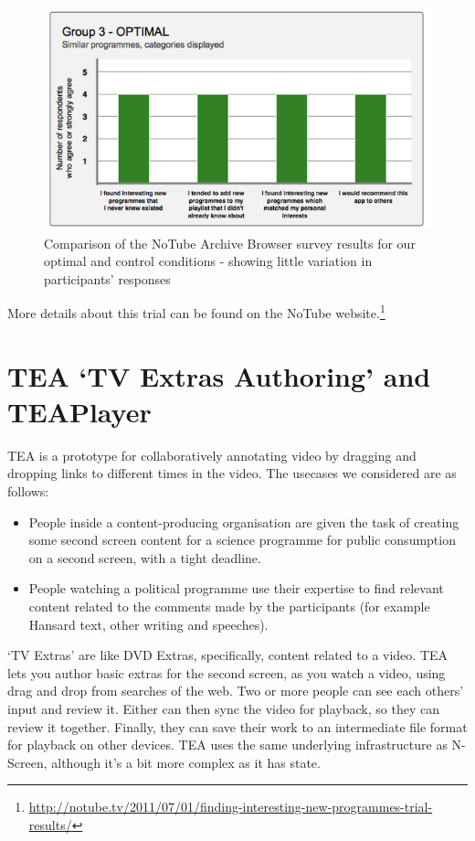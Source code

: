 \documentclass{notube}
\begin{document}
\begin{figure}[htbp]
\begin{center}
\includegraphics[width=6in]{images/group3.png}
\caption{Comparison of the NoTube Archive Browser survey results for our optimal and control conditions - showing little variation in participants' responses} \label{fig:group3}
\end{center}
\end{figure}

More details about this trial can be found on the NoTube website.\footnote{\url{http://notube.tv/2011/07/01/finding-interesting-new-programmes-trial-results/}}

\chapter{TEA `TV Extras Authoring' and TEAPlayer}

TEA is a prototype for collaboratively annotating video by dragging and dropping links to different times in the video. The usecases we considered are as follows:   \begin{itemize}
\item{People inside a content-producing organisation are given the task of creating some second screen content for a science programme for public consumption on a second screen, with a tight deadline.} \item{People watching a political programme use their expertise to find relevant content related to the comments made by the participants (for example Hansard text, other writing and speeches).}
\end{itemize}

`TV Extras' are like DVD Extras, specifically, content related to a video. TEA lets you author basic extras for the second screen, as you watch a video, using drag and drop from searches of the web. Two or more people can see each others' input and review it. Either can then sync the video for playback, so they can review it together. Finally, they can save their work to an intermediate file format for playback on other devices. TEA uses the same underlying infrastructure as N-Screen, although it's a bit more complex as it has state.
\end{document}
